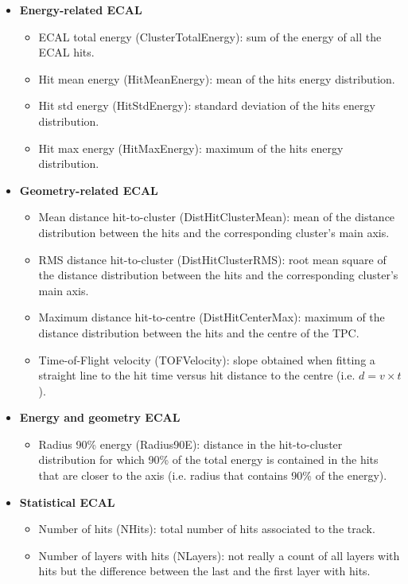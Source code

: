 \begin{itemize}
	\item \textbf{Energy-related ECAL}
	\begin{itemize}
		\item ECAL total energy (ClusterTotalEnergy): sum of the energy of all the ECAL hits.
	\item Hit mean energy (HitMeanEnergy): mean of the hits energy distribution.
	\item Hit std energy (HitStdEnergy): standard deviation of the hits energy distribution.
	\item Hit max energy (HitMaxEnergy): maximum of the hits energy distribution.
	\end{itemize}
	\item \textbf{Geometry-related ECAL}
	\begin{itemize}
		\item Mean distance hit-to-cluster (DistHitClusterMean): mean of the distance distribution between the hits and the corresponding cluster's main axis.
		\item RMS distance hit-to-cluster (DistHitClusterRMS): root mean square of the distance distribution between the hits and the corresponding cluster's main axis.
		\item Maximum distance hit-to-centre (DistHitCenterMax): maximum of the distance distribution between the hits and the centre of the TPC.
		\item Time-of-Flight velocity (TOFVelocity): slope obtained when fitting a straight line to the hit time versus hit distance to the centre (i.e. $d = v \times t$).
	\end{itemize}
	\item \textbf{Energy and geometry ECAL}
	\begin{itemize}
		\item Radius 90\% energy (Radius90E): distance in the hit-to-cluster distribution for which 90\% of the total energy is contained in the hits that are closer to the axis (i.e. radius that contains 90\% of the energy).
	\end{itemize}
	\item \textbf{Statistical ECAL}
	\begin{itemize}
		\item Number of hits (NHits): total number of hits associated to the track.
		\item Number of layers with hits (NLayers): not really a count of all layers with hits but the difference between the last and the first layer with hits.
	\end{itemize}
\end{itemize}

